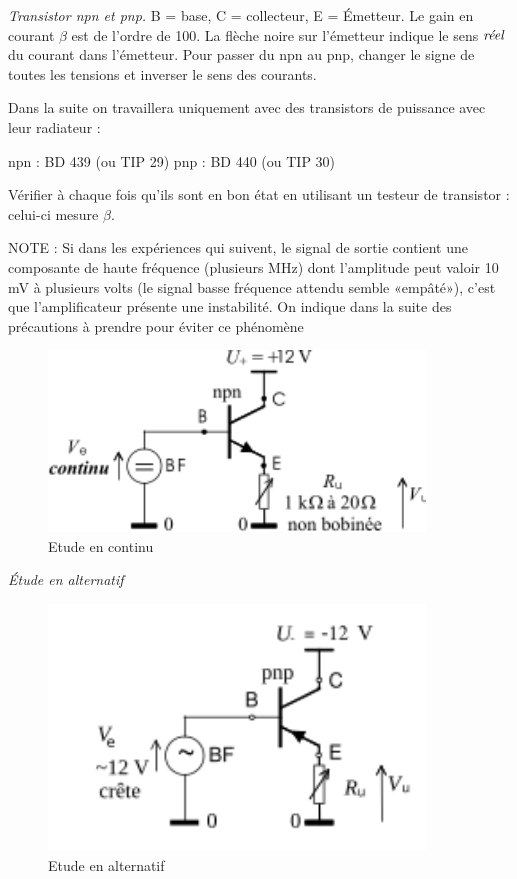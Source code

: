 \documentclass{article}%
\begin{document}
\textit{Transistor npn et pnp.} B = base, C = collecteur, E = Émetteur. Le gain en courant $\beta$ est de l’ordre de 100. La flèche noire sur l’émetteur indique le sens $\emph{réel}$ du courant dans l’émetteur. Pour passer du npn au pnp, changer le signe de toutes les tensions et inverser le sens des courants.


Dans la suite on travaillera uniquement avec des transistors de puissance avec leur radiateur :

    npn : BD 439 (ou TIP 29)
    pnp : BD 440 (ou TIP 30)

Vérifier à chaque fois qu'ils sont en bon état en utilisant un testeur de transistor : celui-ci mesure $\beta$.

NOTE : Si dans les expériences qui suivent, le signal de sortie contient une composante de haute fréquence (plusieurs MHz) dont l'amplitude peut valoir 10 mV à plusieurs volts (le signal basse fréquence attendu semble «empâté»), c'est que l'amplificateur présente une instabilité. On indique dans la suite des précautions à prendre pour éviter ce phénomène

\begin{figure}
	\centerline{\includegraphics[width=10cm]{images-exp/Transistor_continu.png}}
	\caption{Etude en continu}
\end{figure}

\textit{Étude en alternatif}

\begin{figure}
	\centerline{\includegraphics[width=10cm]{images-exp/Transistor_alternatif.png}}
	\caption{Etude en alternatif}
\end{figure}
\end{document}
